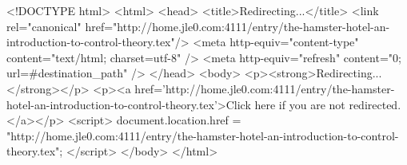<!DOCTYPE html>
<html>
<head>
<title>Redirecting...</title>
<link rel="canonical" href="http://home.jle0.com:4111/entry/the-hamster-hotel-an-introduction-to-control-theory.tex"/>
<meta http-equiv="content-type" content="text/html; charset=utf-8" />
<meta http-equiv="refresh" content="0; url=#{destination_path}" />
</head>
<body>
  <p><strong>Redirecting...</strong></p>
  <p><a href='http://home.jle0.com:4111/entry/the-hamster-hotel-an-introduction-to-control-theory.tex'>Click here if you are not redirected.</a></p>
  <script>
    document.location.href = "http://home.jle0.com:4111/entry/the-hamster-hotel-an-introduction-to-control-theory.tex";
  </script>
</body>
</html>
